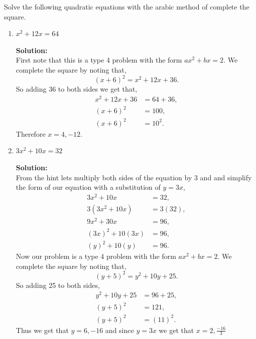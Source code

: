 \documentclass[12pt]{article}
\makeatletter
\theoremstyle{homework}
\newenvironment{exercise}[1]
{\def\@currentlabel{#1}\exercisecore}
{\endexercisecore}
\newcommand{\localhead}[1]{\par\smallskip\noindent\textbf{#1}\nobreak\\}%
\newcommand\solution{\localhead{Solution:}}
\makeatother
\begin{document}
\begin{exercise}{1} Solve the following quadratic equations with the arabic method of complete the square.\\
  \begin{enumerate}
    \item $x^2 + 12x = 64$\\
    \solution First note that this is a type 4 problem with the form $ax^2 + bx = 2$. We complete the square by noting that, 
    \begin{equation*}
      (x + 6)^2 = x^2 + 12x + 36. 
    \end{equation*}
    So adding 36 to both sides we get that,
    \begin{align*}
      x^2 + 12x + 36 &= 64 + 36,\\
      (x + 6)^2 &= 100,\\
      (x + 6)^2 &= 10^2.
    \end{align*}
    Therefore $x = 4, -12$. 




    \vspace{.25in}

    \item $3x^2 + 10x = 32$\\
    \solution From the hint lets multiply both sides of the equation by 3 and and simplify the form of our equation with a substitution of $y = 3x$, 
    \begin{align*}
      3x^2 + 10x &= 32,\\
      3(3x^2 + 10x) &= 3(32),\\
      9x^2 + 30x &= 96,\\
      (3x)^2 + 10(3x) &= 96,\\
      (y)^2 + 10(y) &= 96.
    \end{align*}
    Now our problem is a type 4 problem with the form $ax^2 + bx = 2$. We complete the square by noting that, 
    \begin{equation*}
      (y + 5)^2 = y^2 + 10y + 25. 
    \end{equation*}
    So adding 25 to both sides, 
    \begin{align*}
      y^2 + 10y + 25 &= 96 + 25,\\
      (y + 5)^2 &= 121,\\
      (y + 5)^2 &= (11)^2.
    \end{align*}
    Thus we get that $y = 6, -16$ and since $y = 3x$ we get that $x = 2, \frac{-16}{3}$
    \vspace{.25in}


  \end{enumerate}
\end{exercise}
\vspace{.5in}
\end{document}
